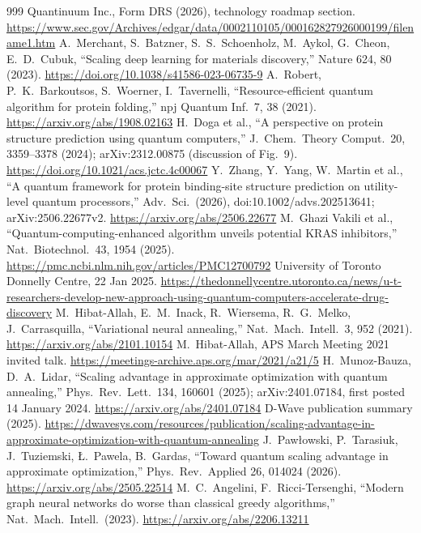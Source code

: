 \begin{thebibliography}{999}
 Quantinuum Inc., Form DRS (2026), technology roadmap section. \url{https://www.sec.gov/Archives/edgar/data/0002110105/000162827926000199/filename1.htm}
 A.~Merchant, S.~Batzner, S.~S.~Schoenholz, M.~Aykol, G.~Cheon, E.~D.~Cubuk, ``Scaling deep learning for materials discovery,'' Nature 624, 80 (2023). \url{https://doi.org/10.1038/s41586-023-06735-9}
 A.~Robert, P.~K.~Barkoutsos, S.~Woerner, I.~Tavernelli, ``Resource-efficient quantum algorithm for protein folding,'' npj Quantum Inf.\ 7, 38 (2021). \url{https://arxiv.org/abs/1908.02163}
 H.~Doga et al., ``A perspective on protein structure prediction using quantum computers,'' J.\ Chem.\ Theory Comput.\ 20, 3359--3378 (2024); arXiv:2312.00875 (discussion of Fig.~9). \url{https://doi.org/10.1021/acs.jctc.4c00067}
 Y.~Zhang, Y.~Yang, W.~Martin et al., ``A quantum framework for protein binding-site structure prediction on utility-level quantum processors,'' Adv.\ Sci.\ (2026), doi:10.1002/advs.202513641; arXiv:2506.22677v2. \url{https://arxiv.org/abs/2506.22677}
 M.~Ghazi Vakili et al., ``Quantum-computing-enhanced algorithm unveils potential KRAS inhibitors,'' Nat.\ Biotechnol.\ 43, 1954 (2025). \url{https://pmc.ncbi.nlm.nih.gov/articles/PMC12700792}
 University of Toronto Donnelly Centre, 22 Jan 2025. \url{https://thedonnellycentre.utoronto.ca/news/u-t-researchers-develop-new-approach-using-quantum-computers-accelerate-drug-discovery}
 M.~Hibat-Allah, E.~M.~Inack, R.~Wiersema, R.~G.~Melko, J.~Carrasquilla, ``Variational neural annealing,'' Nat.\ Mach.\ Intell.\ 3, 952 (2021). \url{https://arxiv.org/abs/2101.10154}
 M.~Hibat-Allah, APS March Meeting 2021 invited talk. \url{https://meetings-archive.aps.org/mar/2021/a21/5}
 H.~Munoz-Bauza, D.~A.~Lidar, ``Scaling advantage in approximate optimization with quantum annealing,'' Phys.\ Rev.\ Lett.\ 134, 160601 (2025); arXiv:2401.07184, first posted 14 January 2024. \url{https://arxiv.org/abs/2401.07184}
 D-Wave publication summary (2025). \url{https://dwavesys.com/resources/publication/scaling-advantage-in-approximate-optimization-with-quantum-annealing}
 J.~Paw{\l}owski, P.~Tarasiuk, J.~Tuziemski, {\L}.~Pawela, B.~Gardas, ``Toward quantum scaling advantage in approximate optimization,'' Phys.\ Rev.\ Applied 26, 014024 (2026). \url{https://arxiv.org/abs/2505.22514}
 M.~C.~Angelini, F.~Ricci-Tersenghi, ``Modern graph neural networks do worse than classical greedy algorithms,'' Nat.\ Mach.\ Intell.\ (2023). \url{https://arxiv.org/abs/2206.13211}

\end{thebibliography}
